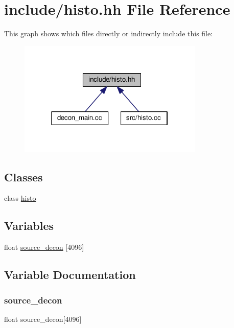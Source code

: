 \hypertarget{histo_8hh}{}\section{include/histo.hh File Reference}
\label{histo_8hh}
This graph shows which files directly or indirectly include this file\+:
\nopagebreak
\begin{figure}[H]
\begin{center}
\leavevmode
\includegraphics[width=250pt]{histo_8hh__dep__incl}
\end{center}
\end{figure}
\subsection*{Classes}
\begin{DoxyCompactItemize}
\item 
class \mbox{\hyperlink{classhisto}{histo}}
\end{DoxyCompactItemize}
\subsection*{Variables}
\begin{DoxyCompactItemize}
\item 
float \mbox{\hyperlink{histo_8hh_a43cce2495419f8219330c5474b026242}{source\+\_\+decon}} \mbox{[}4096\mbox{]}
\end{DoxyCompactItemize}


\subsection{Variable Documentation}
\mbox{\label{histo_8hh_a43cce2495419f8219330c5474b026242}} 
\subsubsection{\texorpdfstring{source\+\_\+decon}{source\_decon}}
{\footnotesize\ttfamily float source\+\_\+decon\mbox{[}4096\mbox{]}}

